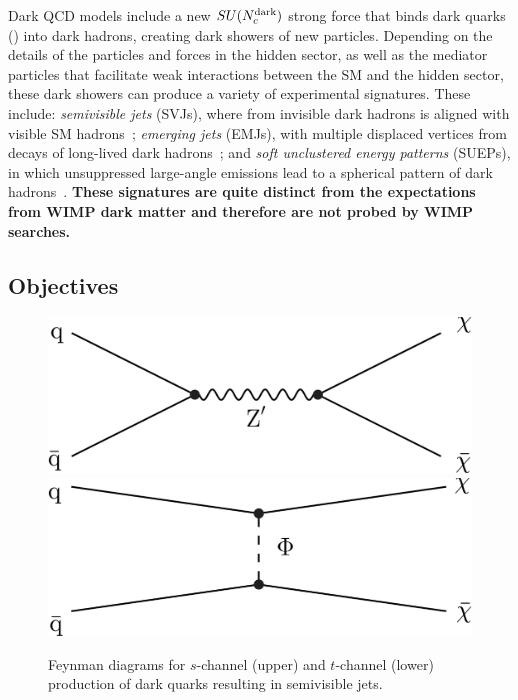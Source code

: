 Dark QCD models include a new $SU(N_{c}^{\text{dark}})$ strong force that binds dark quarks (\Pqdark) into dark hadrons, creating dark showers of new particles.
Depending on the details of the particles and forces in the hidden sector,
as well as the mediator particles that facilitate weak interactions between the SM and the hidden sector,
these dark showers can produce a variety of experimental signatures.
These include: \emph{semivisible jets} (SVJs), where \met from invisible dark hadrons is aligned with visible SM hadrons~\cite{Cohen:2015toa};
\emph{emerging jets} (EMJs), with multiple displaced vertices from decays of long-lived dark hadrons~\cite{Schwaller:2015gea};
and \emph{soft unclustered energy patterns} (SUEPs), in which unsuppressed large-angle emissions lead to a spherical pattern of dark hadrons~\cite{Knapen:2016hky}.
\textbf{These signatures are quite distinct from the expectations from WIMP dark matter and therefore are not probed by WIMP searches.}

\subsection{Objectives}\label{subsec:dmobj}

\begin{figure}
\centering
\includegraphics[width=0.47\myfigurewidth]{figures/zPrime_feyn.pdf}\\
\includegraphics[width=0.47\myfigurewidth]{figures/tChan_feyn.pdf}
\caption{Feynman diagrams for $s$-channel (upper) and $t$-channel (lower) production of dark quarks \Pqdark resulting in semivisible jets.}
\label{fig:diagrams}
\end{figure}

